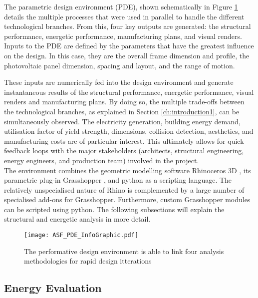 
The parametric design environment (PDE), shown schematically in Figure \ref{fig:performative} details the multiple processes that were used in parallel to handle the different technological branches. From this, four key outputs are generated: the structural performance, energetic performance, manufacturing plans, and visual renders. Inputs to the PDE are defined by the parameters that have the greatest influence on the design. In this case, they are the overall frame dimension and profile, the photovoltaic panel dimension, spacing and layout, and the range of motion. 

These inputs are numerically fed into the design environment and generate instantaneous results of the structural performance, energetic performance, visual renders and manufacturing plans. By doing so, the multiple trade-offs between the technological branches, as explained in Section \ref{ch:introduction1}, can be simultaneously observed. The electricity generation, building energy demand, utilisation factor of yield strength, dimensions, collision detection, aesthetics, and manufacturing costs are of particular interest. This ultimately allows for quick feedback loops with the major stakeholders (architects, structural engineering, energy engineers, and production team) involved in the project. \\


The environment combines the geometric modelling software Rhinoceros 3D \cite{Rhino}, its parametric plug-in Grasshopper \cite{grasshopper}, and python \cite{python} as a scripting language. The relatively unspecialised nature of Rhino is complemented by a large number of specialised add-ons for Grasshopper. Furthermore, custom Grasshopper modules can be scripted using python. The following subsections will explain the structural and energetic analysis in more detail.

\begin{figure}
\begin{center}
\texttt{[image: ASF\_PDE\_InfoGraphic.pdf]}
\caption{The performative design environment is able to link four analysis methodologies for rapid design itterations}
\label{fig:performative}
\end{center}
\end{figure}

\subsection{Energy Evaluation}
\label{ch:energy}

